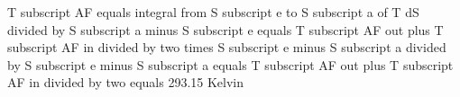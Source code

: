 T subscript AF equals integral from S subscript e to S subscript a of T dS divided by S subscript a minus S subscript e equals T subscript AF out plus T subscript AF in divided by two times S subscript e minus S subscript a divided by S subscript e minus S subscript a equals T subscript AF out plus T subscript AF in divided by two equals 293.15 Kelvin
